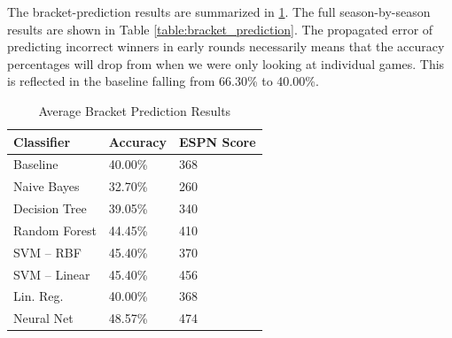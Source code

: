 \documentclass[]{article}
\begin{document}
The bracket-prediction results are summarized in \ref{table:bracket_summary}. The full season-by-season results are shown in Table \ref{table:bracket_prediction}. The propagated error of predicting incorrect winners in early rounds necessarily means that the accuracy percentages will drop from when we were only looking at individual games. This is reflected in the baseline falling from 66.30\% to 40.00\%.

\begin{table}[ht]
\centering
\begin{tabular}{@{}lll@{}}
\toprule
   Classifier           & Accuracy & ESPN Score \\ \midrule
   Baseline             & 40.00\%         & 368           \\
   Naive Bayes          & 32.70\%         & 260           \\
   Decision Tree        & 39.05\%         & 340           \\
   Random Forest        & 44.45\%         & 410           \\
   SVM -- RBF           & 45.40\%         & 370           \\
   SVM -- Linear        & 45.40\%         & 456           \\
   Lin. Reg.            & 40.00\%         & 368           \\
   Neural Net           & 48.57\%         & 474           \\
\bottomrule
\end{tabular}
\caption{Average Bracket Prediction Results}
\label{table:bracket_summary}
\end{table}
\end{document}
